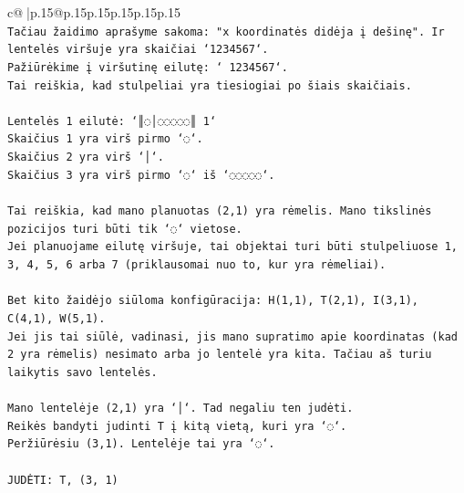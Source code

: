 \documentclass{article}
\begin{document}
{\begin{supertabular}{c@{$\;$}|p{.15\linewidth}@{}p{.15\linewidth}p{.15\linewidth}p{.15\linewidth}p{.15\linewidth}p{.15\linewidth}}
{{{\\ 
\texttt{Tačiau žaidimo aprašyme sakoma: "x koordinatės didėja į dešinę". Ir lentelės viršuje yra skaičiai `1234567`.} \\
\texttt{Pažiūrėkime į viršutinę eilutę: ` 1234567`.} \\
\texttt{Tai reiškia, kad stulpeliai yra tiesiogiai po šiais skaičiais.} \\
\\ 
\texttt{Lentelės 1 eilutė: `║◌│◌◌◌◌◌║ 1`} \\
\texttt{Skaičius 1 yra virš pirmo `◌`.} \\
\texttt{Skaičius 2 yra virš `│`.} \\
\texttt{Skaičius 3 yra virš pirmo `◌` iš `◌◌◌◌◌`.} \\
\\ 
\texttt{Tai reiškia, kad mano planuotas (2,1) yra rėmelis. Mano tikslinės pozicijos turi būti tik `◌` vietose.} \\
\texttt{Jei planuojame eilutę viršuje, tai objektai turi būti stulpeliuose 1, 3, 4, 5, 6 arba 7 (priklausomai nuo to, kur yra rėmeliai).} \\
\\ 
\texttt{Bet kito žaidėjo siūloma konfigūracija: H(1,1), T(2,1), I(3,1), C(4,1), W(5,1).} \\
\texttt{Jei jis tai siūlė, vadinasi, jis mano supratimo apie koordinatas (kad 2 yra rėmelis) nesimato arba jo lentelė yra kita. Tačiau aš turiu laikytis savo lentelės.} \\
\\ 
\texttt{Mano lentelėje (2,1) yra `│`. Tad negaliu ten judėti.} \\
\texttt{Reikės bandyti judinti T į kitą vietą, kuri yra `◌`.} \\
\texttt{Peržiūrėsiu (3,1). Lentelėje tai yra `◌`.} \\
\\ 
\texttt{JUDĖTI: T, (3, 1)} \\
            }
        }
    }
     \\ \\


\end{supertabular}}
\end{document}
